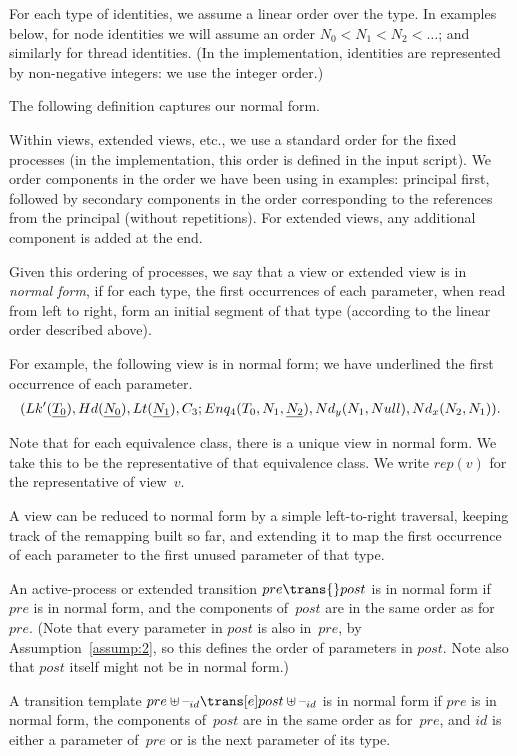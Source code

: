 For each type of identities, we assume a linear order over the type.  In
examples below, for node identities we will assume an order $N_0 < N_1 <
N_2 < \ldots$; and similarly for thread identities.  (In the implementation,
identities are represented by non-negative integers: we use the integer
order.)

The following definition captures our normal form.
%
\begin{definition}
Within views, extended views, etc., we use a standard order for the fixed
processes (in the implementation, this order is defined in the input script).
We order components in the order we have been using in examples: principal
first, followed by secondary components in the order corresponding to the
references from the principal (without repetitions).  For extended views, any
additional component is added at the end.  

Given this ordering of processes, we say that a view or extended view is in
\emph{normal form}, if for each type, the first occurrences of each parameter,
when read from left to right, form an initial segment of that type (according
to the linear order described above).   
\end{definition}

For example, the following view is in normal form; we have underlined the
first occurrence of each parameter.
\[
\begin{align}
(Lk'(\underline{T_0}), Hd(\underline{N_0}), 
    Lt(\underline{N_1}), C_3; 
  Enq_4(T_0, N_1, \underline{N_2}), Nd_y(N_1, Null),Nd_x(N_2, N_1)) .
\end{align}
\]

Note that for each equivalence class, there is a unique view in normal form.
We take this to be the representative of that equivalence class.  We write
$rep(v)$ for the representative of view~$v$. 

A view can be reduced to normal form by a simple left-to-right traversal,
keeping track of the remapping built so far, and extending it to map the first
occurrence of each parameter to the first unused parameter of that type.


\begin{definition}
An active-process or extended transition $pre \trans{} post$ is in normal form
if $pre$ is in normal form, and the components of~$post$ are in the same order
as for~$pre$.  (Note that every parameter in $post$ is also in~$pre$, by
Assumption~\ref{assump:2}, so this defines the order of parameters in $post$.
Note also that $post$ itself might not be in normal form.)


A transition template $pre \uplus \hole{id} \trans[e] post \uplus \hole{id}$
is in normal form if $pre$ is in normal form, the components of~$post$ are in
the same order as for~$pre$, and $id$ is either a parameter of~$pre$ or is the
next parameter of its type.
\end{definition}

